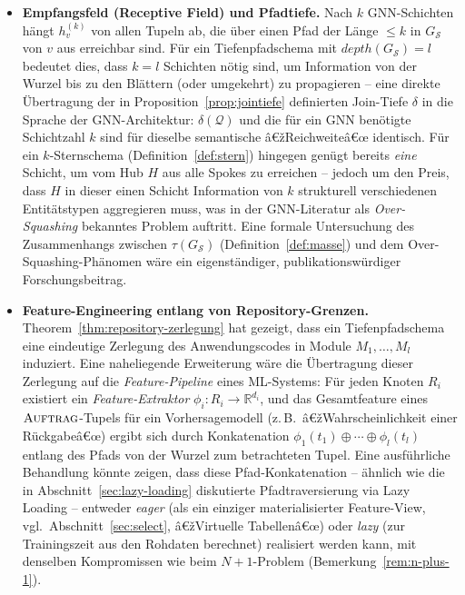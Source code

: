 ﻿\documentclass[a4paper,12pt]{report}
\theoremstyle{definition}
\theoremstyle{remark}
\newcommand{\depth}{\mathit{depth}}
\begin{document}
\begin{itemize}
  \item \textbf{Empfangsfeld (Receptive Field) und Pfadtiefe.}
    Nach $k$ GNN-Schichten hängt $h_v^{(k)}$ von allen Tupeln ab, die
    über einen Pfad der Länge $\leq k$ in $G_{\mathcal{S}}$ von $v$
    aus erreichbar sind. Für ein Tiefenpfadschema mit
    $\depth(G_{\mathcal{S}})=l$ bedeutet dies, dass $k=l$ Schichten
    nötig sind, um Information von der Wurzel bis zu den Blättern
    (oder umgekehrt) zu propagieren -- eine direkte
    Übertragung der in Proposition~\ref{prop:jointiefe}
    definierten Join-Tiefe $\delta$ in die Sprache der GNN-Architektur:
    $\delta(\mathcal{Q})$ und die für ein GNN benötigte Schichtzahl
    $k$ sind für dieselbe semantische â€žReichweiteâ€œ identisch. Für ein
    $k$-Sternschema (Definition~\ref{def:stern}) hingegen genügt
    bereits \emph{eine} Schicht, um vom Hub $H$ aus alle Spokes zu
    erreichen -- jedoch um den Preis, dass $H$ in dieser einen
    Schicht Information von $k$ strukturell verschiedenen
    Entitätstypen aggregieren muss, was in der GNN-Literatur als
    \emph{Over-Squashing} bekanntes Problem auftritt. Eine
    formale Untersuchung des Zusammenhangs zwischen
    $\tau(G_{\mathcal{S}})$ (Definition~\ref{def:masse}) und dem
    Over-Squashing-Phänomen wäre ein eigenständiger,
    publikationswürdiger Forschungsbeitrag.

  \item \textbf{Feature-Engineering entlang von Repository-Grenzen.}
    Theorem~\ref{thm:repository-zerlegung} hat gezeigt, dass ein
    Tiefenpfadschema eine eindeutige Zerlegung des Anwendungscodes in
    Module $M_1,\ldots,M_l$ induziert. Eine naheliegende Erweiterung
    wäre die Übertragung dieser Zerlegung auf die
    \emph{Feature-Pipeline} eines ML-Systems: Für jeden Knoten $R_i$
    existiert ein \emph{Feature-Extraktor} $\phi_i: R_i \to
    \mathbb{R}^{d_i}$, und das Gesamtfeature eines
    $\textsc{Auftrag}$-Tupels für ein Vorhersagemodell (z.\,B.\
    â€žWahrscheinlichkeit einer Rückgabeâ€œ) ergibt sich durch
    Konkatenation $\phi_1(t_1)\oplus\cdots\oplus\phi_l(t_l)$ entlang
    des Pfads von der Wurzel zum betrachteten Tupel. Eine
    ausführliche Behandlung könnte zeigen, dass diese
    Pfad-Konkatenation -- ähnlich wie die in
    Abschnitt~\ref{sec:lazy-loading} diskutierte Pfadtraversierung
    via Lazy Loading -- entweder \emph{eager} (als ein einziger
    materialisierter Feature-View, vgl.\
    Abschnitt~\ref{sec:select}, â€žVirtuelle Tabellenâ€œ) oder
    \emph{lazy} (zur Trainingszeit aus den Rohdaten berechnet)
    realisiert werden kann, mit denselben Kompromissen wie beim
    $N{+}1$-Problem (Bemerkung~\ref{rem:n-plus-1}).


\end{itemize}
\end{document}
